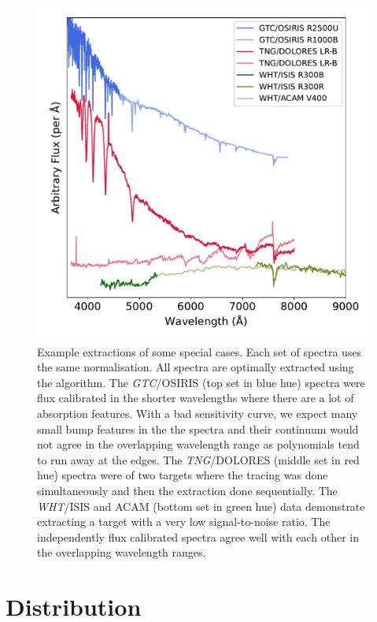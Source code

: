 \documentclass[linenumbers, twocolumn]{aastex631}
\begin{document}
\begin{figure}
    \centering
    \includegraphics[width=\columnwidth]{fig_10_use_case_plots.pdf}
    \caption{Example extractions of some special cases. Each set of spectra
    uses the same normalisation. All spectra are optimally extracted using the
    \citet{1986PASP...98..609H} algorithm. The \textit{GTC}/OSIRIS (top set in blue hue)
    spectra were flux calibrated in the shorter wavelengths where there are a
    lot of absorption features. With a bad sensitivity curve, we expect many
    small bump features in the the spectra and their continuum would not agree
    in the overlapping wavelength range as polynomials tend to run away at the
    edges. The \textit{TNG}/DOLORES (middle set in red hue) spectra were of two targets where
    the tracing was done simultaneously and then the extraction done
    sequentially. The \textit{WHT}/ISIS and ACAM (bottom set in green hue) data demonstrate
    extracting a target with a very low signal-to-noise ratio. The independently
    flux calibrated spectra agree well with each other in the overlapping
    wavelength ranges.}
    \label{fig:use_cases}
\end{figure}

\section{Distribution}
\label{sec:distribution}
\end{document}
